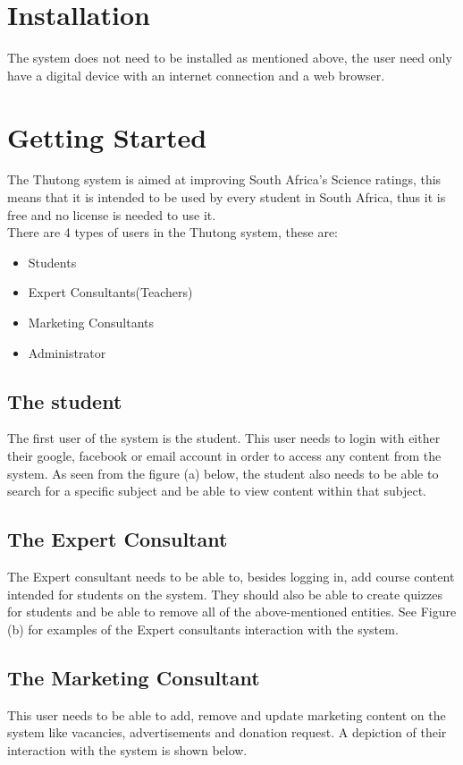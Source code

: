 \documentclass[12pt,a4paper]{article}
\begin{document}
		
	\section{Installation}
		The system does not need to be installed as mentioned above, the user need only have a digital device with an internet connection and a web browser.
		
	\section{Getting Started}
		The Thutong system is aimed at improving South Africa's Science ratings, this means that it is intended to be used by every student in South Africa, thus it is free and no license is needed to use it.\\
		There are 4 types of users in the Thutong system, these are:
		\begin{itemize}
			\item Students
			\item Expert Consultants(Teachers)
			\item Marketing Consultants
			\item Administrator
		\end{itemize} 
		  
		\subsection{The student}
		 The first user of the system is the student. This user needs to login with either their google, facebook or email account in order to access any content from the system. As seen from the figure (a) below, the student also needs to be able to search for a specific subject and be able to view content within that subject.
		 
		 \subsection{The Expert Consultant}
		 The Expert consultant needs to be able to, besides logging in, add course content intended for students on the system. They should also be able to create quizzes for students and be able to remove all of the above-mentioned entities. See Figure (b) for examples of the Expert consultants interaction with the system.
		\subsection{The Marketing Consultant}
		 This user needs to be able to add, remove and update marketing content on the system like vacancies, advertisements and donation request. A depiction of their interaction with the system is shown below.
		 
\end{document}
